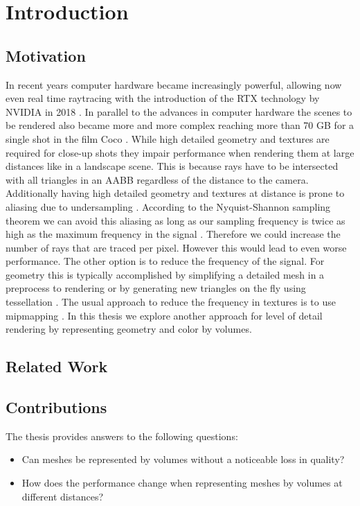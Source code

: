\chapter{Introduction}
\label{chap:intro}

\section{Motivation}
\label{sect:motivation}
In recent years computer hardware became increasingly powerful, allowing now even real time raytracing with the introduction of the RTX technology by NVIDIA in 2018 \cite[pp. 31 - 38]{turing_whitepaper}.
In parallel to the advances in computer hardware the scenes to be rendered also became more and more complex reaching more than 70 GB for a single shot in the film Coco \cite{pixarxpu}.
While high detailed geometry and textures are required for close-up shots they impair performance when rendering them at large distances like in a landscape scene.
This is because rays have to be intersected with all triangles in an AABB regardless of the distance to the camera.
Additionally having high detailed geometry and textures at distance is prone to aliasing due to undersampling \cite[pp. 409-410]{pbr}.
According to the Nyquist-Shannon sampling theorem we can avoid this aliasing as long as our sampling frequency is twice as high as the maximum frequency in the signal \cite[p. 11]{shannonsampling}.
Therefore we could increase the number of rays that are traced per pixel.
However this would lead to even worse performance.
The other option is to reduce the frequency of the signal.
For geometry this is typically accomplished by simplifying a detailed mesh in a preprocess to rendering \cite[pp. 706 - 712]{realtime} or by generating new triangles on the fly using tessellation \cite[pp. 767 - 781]{realtime}.
The usual approach to reduce the frequency in textures is to use mipmapping \cite[pp. 265 - 267]{fundamentals}.
In this thesis we explore another approach for level of detail rendering by representing geometry and color by volumes.

\section{Related Work}


\section{Contributions}
The thesis provides answers to the following questions:
\begin{itemize}
	\item Can meshes be represented by volumes without a noticeable loss in quality?
	\item How does the performance change when representing meshes by volumes at different distances?
\end{itemize}
